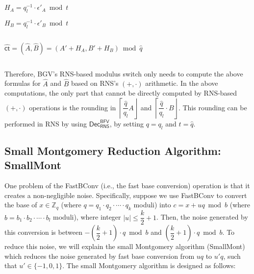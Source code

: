 $ $

$H_A = q_l^{-1}\cdot\epsilon'_A \bmod t$

$H_B = q_l^{-1}\cdot\epsilon'_B \bmod t$

$ $

$\hat{\textsf{ct}} = (\hat{A}, \hat{B}) = (A' + H_A, B' + H_B) \bmod \hat{q}$


$ $


Therefore, BGV's RNS-based modulus switch only needs to compute the above formulas for $\hat{A}$ and $\hat{B}$ based on RNS's $(+, \cdot)$ arithmetic. In the above computations, the only part that cannot be directly computed by RNS-based $(+, \cdot)$ operations is the rounding in $\left\lceil\dfrac{\hat{q}}{q_l} A\right\rfloor$ and $\left\lceil\dfrac{\hat{q}}{q_l}\cdot B\right\rfloor$. This rounding can be performed in RNS by using $\textsf{Dec}_{\textsf{RNS}}^{\textsf{BFV}}$, by setting $q = q_l$ and $t = \hat{q}$. 


\subsection{Small Montgomery Reduction Algorithm: \textsf{SmallMont}}
\label{subsec:rns-smallmont}

One problem of the \textsf{FastBConv} (i.e., the fast base conversion) operation is that it creates a non-negligible noise. Specifically, suppose we use \textsf{FastBConv} to convert the base of $x \in \mathbb{Z}_q$ (where $q = q_1 \cdot q_2 \cdot \cdots \cdot q_k$ moduli) into $c = x + uq \bmod b$ (where $b = b_1 \cdot b_2 \cdot \cdots \cdot b_l$ moduli),  where integer $|u| \leq \dfrac{k}{2}+1$. Then, the noise generated by this conversion is between $-\left(\dfrac{k}{2}+1\right)\cdot q \bmod b$ and $\left(\dfrac{k}{2}+1\right)\cdot q \bmod b$. To reduce this noise, we will explain the small Montgomery algorithm (\textsf{SmallMont}) which reduces the noise generated by fast base conversion from $uq$ to $u'q$, such that $u' \in \{-1, 0, 1\}$. The small Montgomery algorithm is designed as follows:

